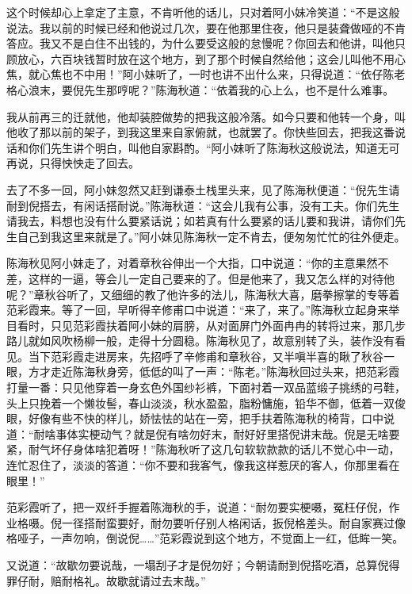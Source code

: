 \documentclass[12pt,UTF8]{ctexbook}
\begin{document}
{{{这个时候却心上拿定了主意，不肯听他的话儿，只对着阿小妹冷笑道：“不是这般说法。我以前的时候已经和他说过几次，要在他那里住夜，他只是装聋做哑的不肯答应。我又不是白住不出钱的，为什么要受这般的怠慢呢？你回去和他讲，叫他只顾放心，六百块钱暂时放在这个地方，到了那个时候自然给他；这会儿叫他不用心焦，就心焦也不中用！”阿小妹听了，一时也讲不出什么来，只得说道：“依仔陈老格心浪末，要倪先生那哼呢？”陈海秋道：“依着我的心上么，也不是什么难事。

我从前再三的迁就他，他却装腔做势的把我这般冷落。如今只要和他转一个身，叫他收了那以前的架子，到我这里来自家俯就，也就罢了。你快些回去，把我这番说话和你们先生讲个明白，叫他自家斟酌。“阿小妹听了陈海秋这般说法，知道无可再说，只得怏怏走了回去。

去了不多一回，阿小妹忽然又赶到谦泰土栈里头来，见了陈海秋便道：“倪先生请耐到倪搭去，有闲话搭耐说。”陈海秋道：“这会儿我有公事，没有工夫。你们先生请我去，料想也没有什么要紧话说；如若真有什么要紧的话儿要和我讲，请你们先生自己到我这里来就是了。”阿小妹见陈海秋一定不肯去，便匆匆忙忙的往外便走。

陈海秋见阿小妹走了，对着章秋谷伸出一个大指，口中说道：“你的主意果然不差，这样的一逼，等会儿一定自己要来的了。但是他来了，我又怎么样的对待他呢？”章秋谷听了，又细细的教了他许多的法儿，陈海秋大喜，磨拳擦掌的专等着范彩霞来。等了一回，早听得辛修甫口中说道：“来了，来了。”陈海秋立起身来举目看时，只见范彩霞扶着阿小妹的肩膀，从对面屏门外面冉冉的转将过来，那几步路儿就如风吹杨柳一般，走得十分圆稳。陈海秋见了，故意别转了头，装作没有看见。当下范彩霞走进房来，先招呼了辛修甫和章秋谷，又半嗔半喜的瞅了秋谷一眼，方才走近陈海秋身旁，低低的叫了一声：“陈老。”陈海秋回过头来，把范彩霞打量一番：只见他穿着一身玄色外国纱衫裤，下面衬着一双品蓝缎子挑绣的弓鞋，头上只挽着一个懒妆髻，春山淡淡，秋水盈盈，脂粉慵施，铅华不御，低着一双俊眼，好像有些不快的样儿，娇怯怯的站在一旁，把手扶着陈海秋的椅背，口中说道：“耐啥事体实梗动气？就是倪有啥勿好末，耐好好里搭倪讲末哉。倪是无啥要紧，耐气坏仔身体啥犯着呀！”陈海秋听了这几句软软款款的话儿不觉心中一动，连忙忍住了，淡淡的答道：“你不要和我客气，像我这样惹厌的客人，你那里看在眼里！”

范彩霞听了，把一双纤手握着陈海秋的手，说道：“耐勿要实梗嗫，冤枉仔倪，作业格嗫。倪一径搭耐蛮要好，耐勿要听仔别人格闲话，扳倪格差头。耐自家赛过像格哑子，一声勿响，倒说倪……”范彩霞说到这个地方，不觉面上一红，低眸一笑。

又说道：“故歇勿要说哉，一塌刮子才是倪勿好；今朝请耐到倪搭吃酒，总算倪得罪仔耐，赔耐格礼。故歇就请过去末哉。”

}}}
\end{document}
